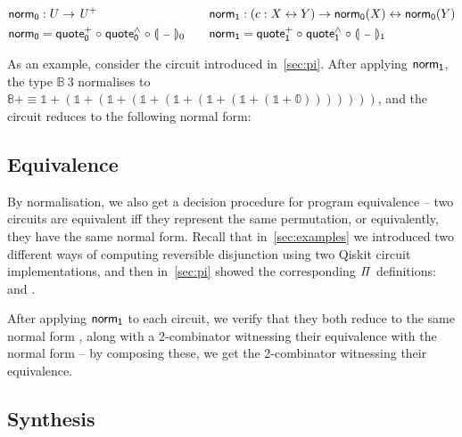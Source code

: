 \begin{definition}
  \begin{gather*}
    \begin{aligned}
      \normt_{0} & : U \to \UPlus                                            \\
      \normt_{0} & = \quotep_{0} \comp \quoteh_{0} \comp \gdenot{\blank}_{0}
    \end{aligned}
    \qquad
    \begin{aligned}
      \normt_{1} & : (c : X \iso Y) \to \normt_{0}(X) \iso \normt_{0}(Y)     \\
      \normt_{1} & = \quotep_{1} \comp \quoteh_{1} \comp \gdenot{\blank}_{1}
    \end{aligned}
  \end{gather*}
\end{definition}

As an example, consider the  circuit introduced in~\cref{sec:pi}. After applying $\normt_{1}$, the
type $\mathbb{B}\ 3$ normalises to $\mathbb{8}+ \equiv \mathbb{1} + (\mathbb{1} + (\mathbb{1} + (\mathbb{1} +
  (\mathbb{1} + (\mathbb{1} + (\mathbb{1} + (\mathbb{1} + \mathbb{0})))))))$, and the circuit reduces to the following
normal form:

\medskip
\resetnormtwo{}

\subsection{Equivalence}

By normalisation, we also get a decision procedure for program equivalence -- two circuits are equivalent iff they
represent the same permutation, or equivalently, they have the same normal form. Recall that in~\cref{sec:examples} we
introduced two different ways of computing reversible disjunction using two Qiskit circuit implementations, and then
in~\cref{sec:pi} showed the corresponding $\mathit{\Pi}$ definitions:  and . 

After applying $\normt_{1}$ to each circuit, we verify that they both reduce to the same normal form
, along with a 2-combinator witnessing their equivalence with the normal form -- by composing
these, we get the 2-combinator witnessing their equivalence.

\subsection{Synthesis}

